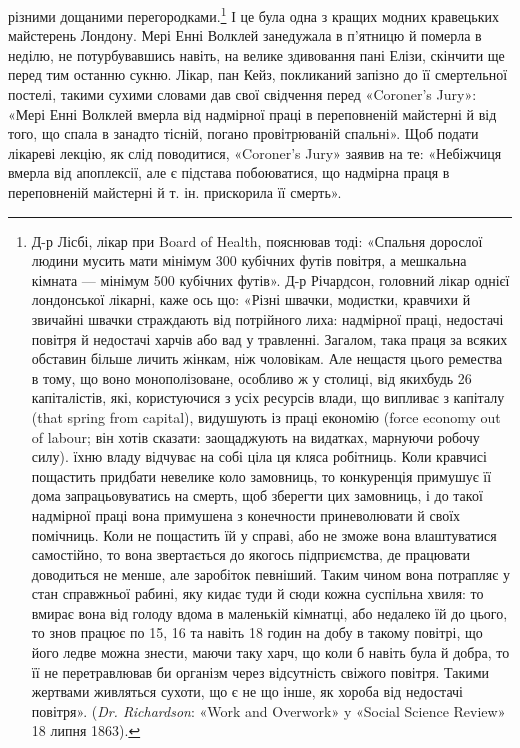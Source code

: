 різними дощаними перегородками.\footnote{
Д-р Лісбі, лікар при Board of Health, пояснював тоді: «Спальня
дорослої людини мусить мати мінімум 300 кубічних футів повітря, а
мешкальна кімната — мінімум 500 кубічних футів». Д-р Річардсон,
головний лікар однієї лондонської лікарні, каже ось що: «Різні швачки,
модистки, кравчихи й звичайні швачки страждають від потрійного лиха:
надмірної праці, недостачі повітря й недостачі харчів або вад у травленні.
Загалом, така праця за всяких обставин більше личить жінкам, ніж чоловікам.
Але нещастя цього ремества в тому, що воно монополізоване, особливо
ж у столиці, від якихбудь 26 капіталістів, які, користуючися з
усіх ресурсів влади, що випливає з капіталу (that spring from capital),
видушують із праці економію (force economy out of labour; він хотів сказати:
заощаджують на видатках, марнуючи робочу силу). їхню владу
відчуває на собі ціла ця кляса робітниць. Коли кравчисі пощастить придбати
невелике коло замовниць, то конкуренція примушує її дома запрацьовуватись
на смерть, щоб зберегти цих замовниць, і до такої надмірної
праці вона примушена з конечности приневолювати й своїх помічниць.
Коли не пощастить їй у справі, або не зможе вона влаштуватися самостійно,
то вона звертається до якогось підприємства, де працювати доводиться
не менше, але заробіток певніший. Таким чином вона потрапляє у стан
справжньої рабині, яку кидає туди й сюди кожна суспільна хвиля: то вмирає
вона від голоду вдома в маленькій кімнатці, або недалеко їй до цього,
то знов працює по 15, 16 та навіть 18 годин на добу в такому повітрі, що
його ледве можна знести, маючи таку харч, що коли б навіть була й добра,
то її не перетравлював би організм через відсутність свіжого повітря.
Такими жертвами живляться сухоти, що є не що інше, як хороба від недостачі
повітря». (\emph{Dr. Richardson}: «Work and Overwork» y «Social Science
Review» 18 липня 1863).
} І це була одна з кращих
модних кравецьких майстерень Лондону. Мері Енні Волклей
занедужала в п’ятницю й померла в неділю, не потурбувавшись
навіть, на велике здивовання пані Елізи, скінчити ще перед тим
останню сукню. Лікар, пан Кейз, покликаний запізно до її смертельної
постелі, такими сухими словами дав свої свідчення перед
«Coroner’s Jury»: «Мері Енні Волклей вмерла від надмірної праці
в переповненій майстерні й від того, що спала в занадто тісній,
погано провітрюваній спальні». Щоб подати лікареві лекцію,
як слід поводитися, «Coroner’s Jury» заявив на те: «Небіжчиця
вмерла від апоплексії, але є підстава побоюватися, що надмірна
праця в переповненій майстерні й т. ін. прискорила її смерть».
\parbreak{}  %
